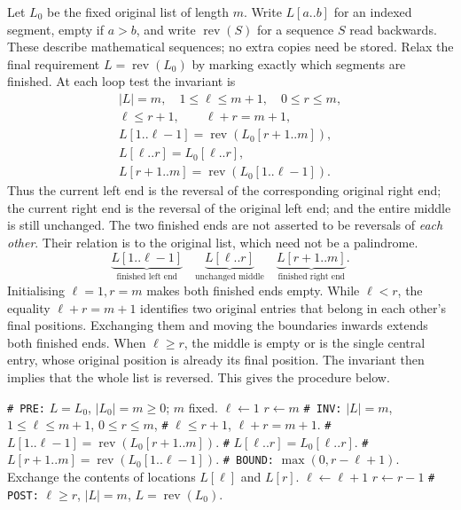 Let $L_0$ be the fixed original list of length $m$. Write $L[a..b]$
for an indexed segment, empty if $a>b$, and write $\operatorname{rev}(S)$
for a sequence $S$ read backwards. These describe mathematical sequences;
no extra copies need be stored. Relax the final requirement
$L=\operatorname{rev}(L_0)$ by marking exactly which segments are finished.
At each loop test the invariant is
\[
\begin{gathered}
|L|=m,\quad 1\leq\ell\leq m+1,\quad 0\leq r\leq m,\\
\ell\leq r+1,\qquad \ell+r=m+1,\\
L[1..\ell-1]=\operatorname{rev}(L_0[r+1..m]),\\
L[\ell..r]=L_0[\ell..r],\\
L[r+1..m]=\operatorname{rev}(L_0[1..\ell-1]).
\end{gathered}
\]
Thus the current left end is the reversal of the corresponding original
right end; the current right end is the reversal of the original left end;
and the entire middle is still unchanged. The two finished ends are not
asserted to be reversals of \emph{each other}. Their relation is to the
original list, which need not be a palindrome.
\[
\underbrace{L[1..\ell-1]}_{\text{finished left end}}\quad
\underbrace{L[\ell..r]}_{\text{unchanged middle}}\quad
\underbrace{L[r+1..m]}_{\text{finished right end}}.
\]
Initialising $\ell=1,r=m$ makes both finished ends empty. While $\ell<r$,
the equality $\ell+r=m+1$ identifies two original entries that belong
in each other's final positions. Exchanging them and moving the boundaries
inwards extends both finished ends. When $\ell\geq r$, the middle is
empty or is the single central entry, whose original position is already
its final position. The invariant then implies that the whole list is
reversed. This gives the procedure below.

\begin{algorithm}[H]
\begin{algorithmic}[1]
\Statex \texttt{\# PRE:} $L=L_0$, $|L_0|=m\geq0$; $m$ fixed.
\State $\ell\leftarrow1$
\State $r\leftarrow m$
\Statex \texttt{\# INV:} $|L|=m$, $1\leq\ell\leq m+1$, $0\leq r\leq m$,
\Statex \texttt{\#} $\ell\leq r+1$, $\ell+r=m+1$.
\Statex \texttt{\#} $L[1..\ell-1]=\operatorname{rev}(L_0[r+1..m])$.
\Statex \texttt{\#} $L[\ell..r]=L_0[\ell..r]$.
\Statex \texttt{\#} $L[r+1..m]=\operatorname{rev}(L_0[1..\ell-1])$.
\Statex \texttt{\# BOUND:} $\max(0,r-\ell+1)$.
\State Exchange the contents of locations $L[\ell]$ and $L[r]$.
\State $\ell\leftarrow\ell+1$
\State $r\leftarrow r-1$
\EndWhile
\Statex \texttt{\# POST:} $\ell\geq r$, $|L|=m$, $L=\operatorname{rev}(L_0)$.
\EndProcedure
\end{algorithmic}
\caption{Reverse a list by modifying its entries.}
\end{algorithm}

